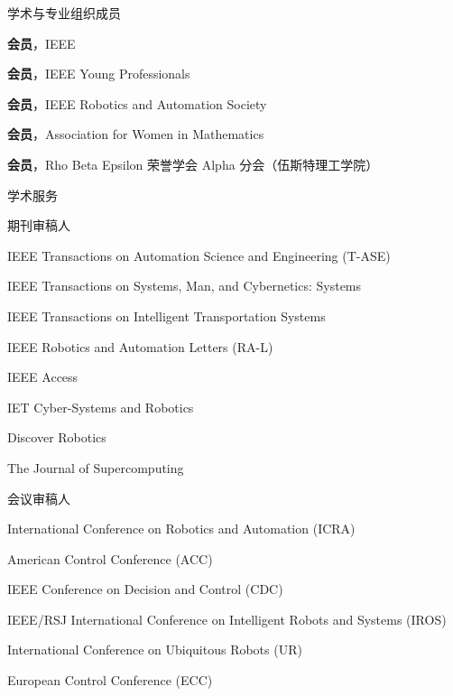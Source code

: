 \documentclass{resume}
\begin{document}
\begin{lSection}{学术与专业组织成员}
\item {\bf 会员}，IEEE
\item {\bf 会员}，IEEE Young Professionals
\item {\bf 会员}，IEEE Robotics and Automation Society
\item {\bf 会员}，Association for Women in Mathematics
\item {\bf 会员}，Rho Beta Epsilon 荣誉学会 Alpha 分会（伍斯特理工学院）
\end{lSection}

\begin{rSection}{学术服务}

\begin{lSubsection}{期刊审稿人}
\item IEEE Transactions on Automation Science and Engineering (T-ASE)
\item IEEE Transactions on Systems, Man, and Cybernetics: Systems
\item IEEE Transactions on Intelligent Transportation Systems
\item IEEE Robotics and Automation Letters (RA-L)
\item IEEE Access
\item IET Cyber-Systems and Robotics
\item Discover Robotics
\item The Journal of Supercomputing
\end{lSubsection}

\begin{lSubsection}{会议审稿人}
\item International Conference on Robotics and Automation (ICRA)
\item American Control Conference (ACC)
\item IEEE Conference on Decision and Control (CDC)
\item IEEE/RSJ International Conference on Intelligent Robots and Systems (IROS)
\item International Conference on Ubiquitous Robots (UR)
\item European Control Conference (ECC)
\end{lSubsection}

\end{rSection}
\end{document}

